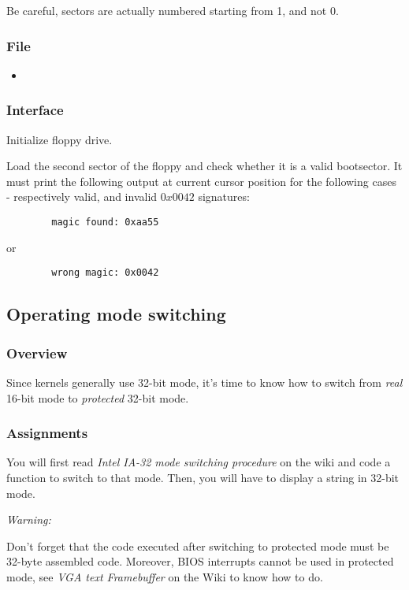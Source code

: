 Be careful, sectors are actually numbered starting from 1, and not 0.

\subsubsection*{File}
\begin{itemize}
  \item {}
\end{itemize}

\subsubsection*{Interface}
{
  Initialize floppy drive.
}

{
  Load the second sector of the floppy and check whether it is a valid
  bootsector. It must print the following output at current cursor
  position for the following cases - respectively valid, and invalid $0x0042$
  signatures:
}
\begin{verbatim}
        magic found: 0xaa55
\end{verbatim}
\command{}
{
  or
}
\begin{verbatim}
        wrong magic: 0x0042
\end{verbatim}

%
%

\newpage

\subsection{Operating mode switching}

\subsubsection*{Overview}
Since kernels generally use 32-bit mode, it's time to know how to switch from
\emph{real} 16-bit mode to \emph{protected} 32-bit mode.

\subsubsection*{Assignments}
You will first read \emph{Intel IA-32 mode switching procedure} on the wiki
and code a function to switch to that mode. Then, you will have to display a
string in 32-bit mode.

{\em Warning:}

Don't forget that the code executed after switching to protected mode must be
32-byte assembled code. Moreover, BIOS interrupts cannot be used in protected
mode, see \emph{VGA text Framebuffer} on the Wiki to know how to do.


